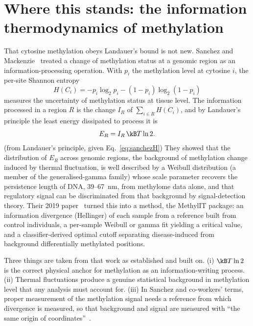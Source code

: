 \section{Where this stands: the information thermodynamics of methylation}\label{sec:sanchez}

That cytosine methylation obeys Landauer's bound is not new. Sanchez and Mackenzie~\cite{Sanchez2016} treated a change of methylation
status at a genomic region as an information-processing operation. With $p_i$ the methylation level at cytosine $i$, the per-site Shannon
entropy
\begin{equation}
  H(C_i)=-p_i\log_2p_i-(1-p_i)\log_2(1-p_i)
  \label{eq:sanchezH}
\end{equation}
measures the uncertainty of methylation status at tissue level. The information processed in a region $R$ is the change $I_R$ of
$\sum_{i\in R}H(C_i)$, and by Landauer's principle the least energy dissipated to process it is
\begin{equation}
  E_R=I_R\,\kB T\ln2 .
  \label{eq:sanchezER}
\end{equation}
\derived{} (from Landauer's principle, given Eq.~\eqref{eq:sanchezH}) They showed that the distribution of $E_R$ across genomic regions, the
background of methylation change induced by thermal fluctuation, is well described by a Weibull distribution (a member of the
generalised-gamma family) whose scale parameter recovers the persistence length of DNA, 39--67~nm, from methylome data alone, and that
regulatory signal can be discriminated from that background by signal-detection theory. \observed{} Their 2019 paper~\cite{Sanchez2019}
turned this into a method, the MethylIT package: an information divergence (Hellinger) of each sample from a reference built from control
individuals, a per-sample Weibull or gamma fit yielding a critical value, and a classifier-derived optimal cutoff separating disease-induced
from background differentially methylated positions. \observed

Three things are taken from that work as established and built on. (i) $\kB T\ln2$ is the correct physical anchor for methylation as an
information-writing process. (ii) Thermal fluctuations produce a genuine statistical background in methylation level that any analysis must
account for. (iii) In Sanchez and co-workers' terms, proper measurement of the methylation signal needs a reference from which divergence is
measured, so that background and signal are measured with ``the same origin of coordinates''~\cite{Sanchez2019}.

